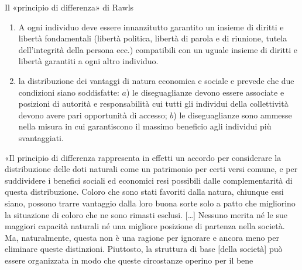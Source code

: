 \documentclass[11pt]{beamer}
\begin{document}
\begin{frame}{Il «principio di differenza» di Rawls}
\begin{enumerate}
\item A ogni individuo deve essere innanzitutto garantito un insieme di diritti
e libertà fondamentali (libertà politica, libertà di parola e di
riunione, tutela dell'integrità della persona ecc.) compatibili con un
uguale insieme di diritti e libertà garantiti a ogni altro individuo.
\item la distribuzione dei vantaggi di natura economica e sociale e prevede che
due condizioni siano soddisfatte: $a$) le diseguaglianze devono essere
associate e posizioni di autorità e responsabilità cui tutti gli
individui della collettività devono avere pari opportunità di accesso;
$b$) le diseguaglianze sono ammesse nella misura in cui garantiscono il
massimo beneficio agli individui più svantaggiati.
\end{enumerate}

\begin{quoting}
\begin{spacing}{.8}\footnotesize
  «Il principio di differenza rappresenta in effetti un accordo per considerare la distribuzione delle doti naturali come un patrimonio per certi versi comune, e per suddividere i benefici sociali ed economici resi possibili dalle complementarità di questa distribuzione. Coloro che sono stati favoriti dalla natura, chiunque essi siano, possono trarre vantaggio dalla loro buona sorte solo a patto che migliorino la situazione di coloro che ne sono rimasti esclusi. [\dots] Nessuno merita né le sue maggiori capacità naturali né una migliore posizione di partenza nella società. Ma, naturalmente, questa non è una ragione per ignorare e ancora meno per eliminare queste distinzioni. Piuttosto, la struttura di base [della società] può essere organizzata in modo che queste circostanze operino per il bene
\end{spacing}
\end{quoting}
\end{frame}
\end{document}
